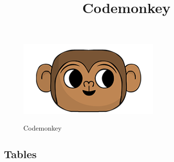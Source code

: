 \documentclass{article}
\title{Codemonkey}
\begin{document}
\begin{figure}[!ht]
   \centering
   \includegraphics[width=0.5\linewidth]{images/icon}
   \begin{titlepage}
      \huge Codemonkey
   \end{titlepage}
   \label{fig:nome-etichetta}
\end{figure}


\pagebreak
\tableofcontents
\pagebreak

\pagebreak

\pagebreak

\pagebreak



\pagebreak

\pagebreak

\pagebreak

\pagebreak

\pagebreak

\pagebreak

\pagebreak

\pagebreak

\pagebreak

\pagebreak


\subsection*{Tables}

\begin{tikzpicture}
   
\end{tikzpicture}
\end{document}

